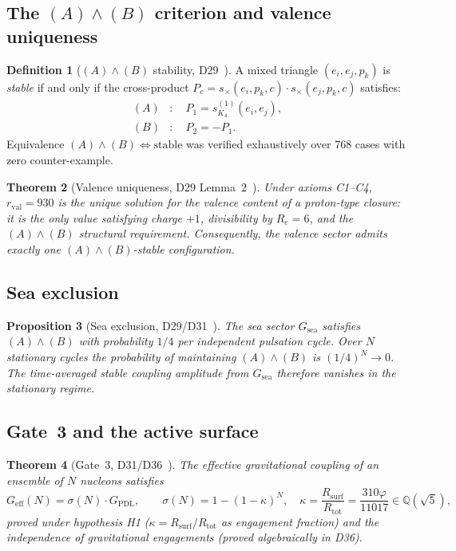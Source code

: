 \documentclass[11pt,a4paper]{article}
\theoremstyle{plain}
\newtheorem{theorem}{Theorem}[section]
\newtheorem{proposition}[theorem]{Proposition}
\theoremstyle{definition}
\newtheorem{definition}[theorem]{Definition}
\theoremstyle{remark}
\newcommand{\rval}{r_{\mathrm{val}}}
\newcommand{\Rtot}{R_{\mathrm{tot}}}
\newcommand{\Rsurf}{R_{\mathrm{surf}}}
\newcommand{\Gsea}{G_{\mathrm{sea}}}
\newcommand{\vp}{\varphi}
\newcommand{\kap}{\kappa}
\newcommand{\sig}{\sigma}
\newcommand{\GPDL}{G_{\mathrm{PDL}}}
\newcommand{\Geff}{G_{\mathrm{eff}}}
\begin{document}
\subsection{The \texorpdfstring{$(A)\wedge(B)$}{(A)∧(B)} criterion and valence uniqueness}

\begin{definition}[$(A)\wedge(B)$ stability, D29~\cite{PDL_D29_2026}]
A mixed triangle $(e_i,e_j,p_k)$ is \emph{stable} if and only if the cross-product
$P_c = s_\times(e_i,p_k,c)\cdot s_\times(e_j,p_k,c)$ satisfies:
\begin{align}
  (A) &:\quad P_1 = s_{K_4}^{(1)}(e_i,e_j), \\
  (B) &:\quad P_2 = -P_1.
\end{align}
Equivalence $(A)\wedge(B) \iff \text{stable}$ was verified exhaustively over $768$
cases with zero counter-example.
\end{definition}

\begin{theorem}[Valence uniqueness, D29 Lemma~2~\cite{PDL_D29_2026}]
\label{thm:val_unique}
Under axioms C1--C4, $\rval = 930$ is the unique solution for the valence content of a
proton-type closure: it is the only value satisfying charge $+1$, divisibility by
$R_e = 6$, and the $(A)\wedge(B)$ structural requirement. Consequently, the valence
sector admits exactly \emph{one} $(A)\wedge(B)$-stable configuration.
\end{theorem}

\subsection{Sea exclusion}

\begin{proposition}[Sea exclusion, D29/D31~\cite{PDL_D29_2026,PDL_D31_2026}]
\label{prop:sea_excl}
The sea sector $\Gsea$ satisfies $(A)\wedge(B)$ with probability $1/4$ per
independent pulsation cycle. Over $N$ stationary cycles the probability of maintaining
$(A)\wedge(B)$ is $(1/4)^N \to 0$. The time-averaged stable coupling amplitude
from $\Gsea$ therefore vanishes in the stationary regime.
\end{proposition}

\subsection{Gate~3 and the active surface}

\begin{theorem}[Gate~3, D31/D36~\cite{PDL_D31_2026,PDL_D36_2026}]
\label{thm:gate3}
The effective gravitational coupling of an ensemble of $N$ nucleons satisfies
\begin{equation}
  \Geff(N) = \sig(N)\cdot\GPDL,
  \qquad
  \sig(N) = 1-(1-\kap)^N,
  \quad \kap = \frac{\Rsurf}{\Rtot} = \frac{310\vp}{11017} \in \mathbb{Q}(\sqrt{5}),
  \label{eq:gate3}
\end{equation}
proved under hypothesis H1 ($\kap = \Rsurf/\Rtot$ as engagement fraction)
and the independence of gravitational engagements (proved algebraically in D36).
\end{theorem}
\end{document}
